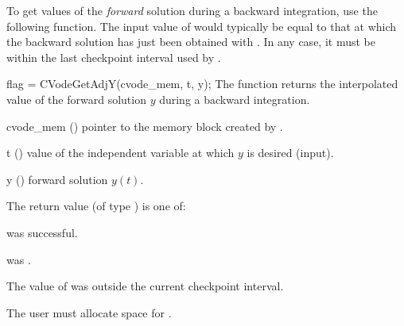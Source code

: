 To get values of the {\it forward} solution during a backward integration,
use the following function.  The input value of  would typically be
equal to that at which the backward solution has just been obtained with
.  In any case, it must be within the last checkpoint interval
used by .

{
  flag = CVodeGetAdjY(cvode\_mem, t, y);
}
{
  The function  returns the interpolated value of
  the forward solution $y$ during a backward integration.
}
{
  \begin{args}
  \item[cvode\_mem] ()
    pointer to the {\cvodes} memory block created by .
  \item[t] ()
    value of the independent variable at which $y$ is desired (input).
  \item[y] () forward solution $y(t)$.
  \end{args}
}
{
  The return value  (of type ) is one of:
 \begin{args}
  \item[\Id{CV\_SUCCESS}]
     was successful.
  \item[\Id{CV\_MEM\_NULL}]
     was .
  \item[\Id{CV\_GETY\_BADT}]
    The value of  was outside the current checkpoint interval.
  \end{args}
}
{
  {\warn} The user must allocate space for .
}

